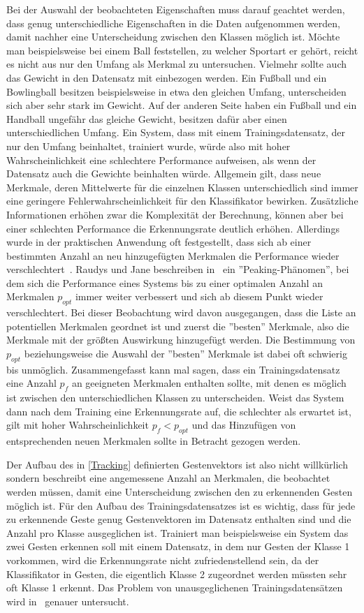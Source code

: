 Bei der Auswahl der beobachteten Eigenschaften muss darauf geachtet werden, dass genug unterschiedliche Eigenschaften in die Daten aufgenommen werden, damit nachher eine Unterscheidung zwischen den Klassen möglich ist. Möchte man beispielsweise bei einem Ball feststellen, zu welcher Sportart er gehört, reicht es nicht aus nur den Umfang als Merkmal zu untersuchen. Vielmehr sollte auch das Gewicht in den Datensatz mit einbezogen werden. Ein Fußball und ein Bowlingball besitzen beispielsweise in etwa den gleichen Umfang, unterscheiden sich aber sehr stark im Gewicht. Auf der anderen Seite haben ein Fußball und ein Handball ungefähr das gleiche Gewicht, besitzen dafür aber einen unterschiedlichen Umfang. Ein System, dass mit einem Trainingsdatensatz, der nur den Umfang beinhaltet, trainiert wurde, würde also mit hoher Wahrscheinlichkeit eine schlechtere Performance aufweisen, als wenn der Datensatz auch die Gewichte beinhalten würde. Allgemein gilt, dass neue Merkmale, deren Mittelwerte für die einzelnen Klassen unterschiedlich sind immer eine geringere Fehlerwahrscheinlichkeit für den Klassifikator bewirken. Zusätzliche Informationen erhöhen zwar die Komplexität der Berechnung, können aber bei einer schlechten Performance die Erkennungsrate deutlich erhöhen. Allerdings wurde in der praktischen Anwendung oft festgestellt, dass sich ab einer bestimmten Anzahl an neu hinzugefügten Merkmalen die Performance wieder verschlechtert~\cite{patternClassification3}. Raudys und Jane beschreiben in~\cite{sampleSize} ein ''Peaking-Phänomen'', bei dem sich die Performance eines Systems bis zu einer optimalen Anzahl an Merkmalen $p_{opt}$ immer weiter verbessert und sich ab diesem Punkt wieder verschlechtert. Bei dieser Beobachtung wird davon ausgegangen, dass die Liste an potentiellen Merkmalen geordnet ist und zuerst die ''besten'' Merkmale, also die Merkmale mit der größten Auswirkung hinzugefügt werden. Die Bestimmung von $p_{opt}$ beziehungsweise die Auswahl der ''besten'' Merkmale ist dabei oft schwierig bis unmöglich. Zusammengefasst kann mal sagen, dass ein Trainingsdatensatz eine Anzahl $p_{f}$ an geeigneten Merkmalen enthalten sollte, mit denen es möglich ist zwischen den unterschiedlichen Klassen zu unterscheiden. Weist das System dann nach dem Training eine Erkennungsrate auf, die schlechter als erwartet ist, gilt mit hoher Wahrscheinlichkeit $p_{f}<p_{opt}$ und das Hinzufügen von entsprechenden neuen Merkmalen sollte in Betracht gezogen werden.

Der Aufbau des in \ref{Tracking} definierten Gestenvektors ist also nicht willkürlich sondern beschreibt eine angemessene Anzahl an Merkmalen, die beobachtet werden müssen, damit eine Unterscheidung zwischen den zu erkennenden Gesten möglich ist. Für den Aufbau des Trainingsdatensatzes ist es wichtig, dass für jede zu erkennende Geste genug Gestenvektoren im Datensatz enthalten sind und die Anzahl pro Klasse ausgeglichen ist. Trainiert man beispielsweise ein System das zwei Gesten erkennen soll mit einem Datensatz, in dem nur Gesten der Klasse 1 vorkommen, wird die Erkennungsrate nicht zufriedenstellend sein, da der Klassifikator in Gesten, die eigentlich Klasse 2 zugeordnet werden müssten sehr oft Klasse 1 erkennt. Das Problem von unausgeglichenen Trainingsdatensätzen wird in~\cite{unbalancedSamples} genauer untersucht. 

